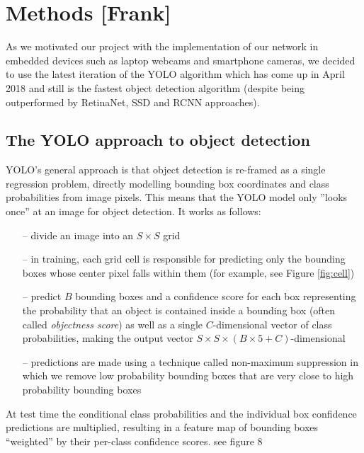 \documentclass[a4paper]{article}
\begin{document}
\section{Methods [Frank]}
As we motivated our project with the implementation of our network in embedded devices such as laptop webcams and smartphone cameras, we decided to use the latest iteration of the YOLO algorithm which has come up in April 2018 and still is the fastest object detection algorithm (despite being outperformed by RetinaNet, SSD and RCNN approaches).
\subsection*{The YOLO approach to object detection}
YOLO's general approach is that object detection is re-framed as a single regression problem, directly
modelling bounding box coordinates and class
probabilities from image pixels. This means that the YOLO model only ”looks
once” at an image for object detection.
It works as follows: 
\begin{itemize}
\item[--] divide an image into an $S\times S$ grid
\item[--] in training, each grid cell is responsible for predicting only the bounding boxes whose center pixel falls within them (for example, see Figure \ref{fig:cell})
\item[--]  predict $B$ bounding boxes and a confidence score for each box representing the probability that an object is contained inside a bounding box (often called \textit{objectness score}) as well as a single $C$-dimensional vector of class probabilities, making the output vector $S \times S \times (B\times 5 +C)$-dimensional

\item[--]  predictions are made using a technique called non-maximum suppression in which we remove low probability bounding boxes that are very close to high probability bounding boxes
\end{itemize}  At test time the conditional class probabilities and the individual box confidence predictions are multiplied, resulting in a feature map of bounding boxes ``weighted'' by their per-class confidence scores. see figure 8%
\end{document}
